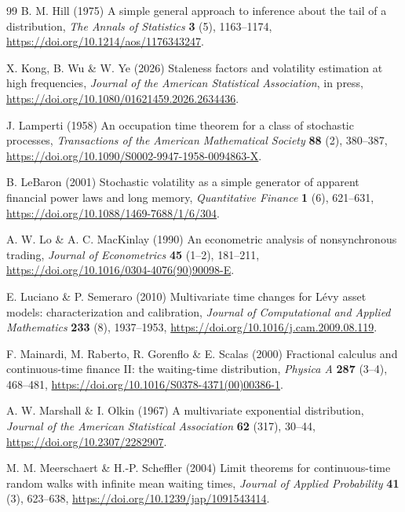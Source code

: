 \documentclass{ws-ijtaf}
\begin{document}
\begin{thebibliography}{99}
 B. M. Hill (1975) A simple general approach to
inference about the tail of a distribution, {\it The Annals of Statistics}
{\bf 3} (5), 1163--1174, \url{https://doi.org/10.1214/aos/1176343247}.

 X. Kong, B. Wu \& W. Ye (2026)
Staleness factors and volatility estimation at high frequencies, {\it Journal of
the American Statistical Association}, in press,
\url{https://doi.org/10.1080/01621459.2026.2634436}.

 J. Lamperti (1958) An occupation time theorem
for a class of stochastic processes, {\it Transactions of the American
Mathematical Society} {\bf 88} (2), 380--387,
\url{https://doi.org/10.1090/S0002-9947-1958-0094863-X}.

 B. LeBaron (2001) Stochastic volatility as a
simple generator of apparent financial power laws and long memory, {\it
Quantitative Finance} {\bf 1} (6), 621--631,
\url{https://doi.org/10.1088/1469-7688/1/6/304}.

 A. W. Lo \& A. C. MacKinlay (1990) An
econometric analysis of nonsynchronous trading, {\it Journal of Econometrics}
{\bf 45} (1--2), 181--211,
\url{https://doi.org/10.1016/0304-4076(90)90098-E}.

 E. Luciano \& P. Semeraro (2010)
Multivariate time changes for Lévy asset models: characterization and
calibration, {\it Journal of Computational and Applied Mathematics} {\bf 233}
(8), 1937--1953, \url{https://doi.org/10.1016/j.cam.2009.08.119}.

 F. Mainardi, M. Raberto,
R. Gorenflo \& E. Scalas (2000) Fractional calculus and continuous-time finance
II: the waiting-time distribution, {\it Physica A} {\bf 287} (3--4), 468--481,
\url{https://doi.org/10.1016/S0378-4371(00)00386-1}.

 A. W. Marshall \& I. Olkin (1967) A
multivariate exponential distribution, {\it Journal of the American Statistical
Association} {\bf 62} (317), 30--44,
\url{https://doi.org/10.2307/2282907}.

 M. M. Meerschaert \&
H.-P. Scheffler (2004) Limit theorems for continuous-time random walks with
infinite mean waiting times, {\it Journal of Applied Probability} {\bf 41} (3),
623--638, \url{https://doi.org/10.1239/jap/1091543414}.


\end{thebibliography}
\end{document}
